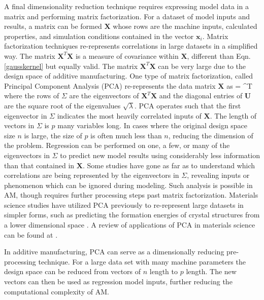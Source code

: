 A final dimensionality reduction technique requires expressing model data in a matrix and performing matrix factorization. For a dataset of model inputs and results, a matrix can be formed $\mathbf{X}$ whose rows are the machine inputs, calculated properties, and simulation conditions contained in the vector $\mathbf{x}_i$. Matrix factorization techniques re-represents correlations in large datasets in a simplified way. The matrix $\mathbf{X}^T\mathbf{X}$ is a measure of covariance within $\mathbf{X}$, different than Eqn. \ref{gausskernel} but equally valid. The matrix $\mathbf{X}^T\mathbf{X}$ can be very large due to the design space of additive manufacturing. One type of matrix factorization, called Principal Component Analysis (PCA) re-represents the data matrix $\mathbf{X}$ as
\eqn
	 =  \mathbf{\Sigma}^T
	\label{PCA}
\equ
where the rows of $\Sigma$ are the eigenvectors of $\mathbf{X}^T\mathbf{X}$ and the diagonal entries of $\mathbf{U}$ are the square root of the eigenvalues $\sqrt{\lambda}$. PCA operates such that the first eigenvector in $\Sigma$ indicates the most heavily correlated inputs of $\mathbf{X}$. The length of vectors in $\Sigma$ is $p$ many variables long. In cases where the original design space size $n$ is large, the size of $p$ is often much less than $n$, reducing the dimension of the problem. Regression can be performed on one, a few, or many of the eigenvectors in $\Sigma$ to predict new model results using considerably less information than that contained in $\mathbf{X}$. Some studies have gone as far as to understand which correlations are being represented by the eigenvectors in $\Sigma$, revealing inputs or phenomenon which can be ignored during modeling. Such analysis is possible in AM, though requires further processing steps past matrix factorization. Materials science studies have utilized PCA previously to re-represent large datasets in simpler forms, such as predicting the formation energies of crystal structures from a lower dimensional space \cite{Curtarolo2003}. A review of applications of PCA in materials science can be found at \cite{Rajan2009}.

In additive manufacturing, PCA can serve as a dimensionally reducing pre-processing technique. For a large data set with many machine parameters the design space can be reduced from vectors of $n$ length to $p$ length. The new vectors can then be used as regression model inputs, further reducing the computational complexity of AM. 
